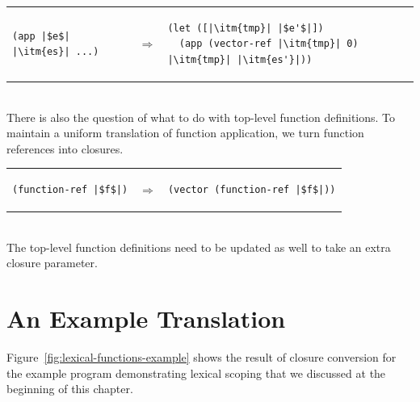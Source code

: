 \documentclass[11pt]{book}
\begin{document}
\begin{tabular}{lll}
\begin{minipage}{0.3\textwidth}
\begin{lstlisting}
(app |$e$| |\itm{es}| ...)
\end{lstlisting}
\end{minipage}
&
$\Rightarrow$
&
\begin{minipage}{0.5\textwidth}
\begin{lstlisting}
(let ([|\itm{tmp}| |$e'$|])
  (app (vector-ref |\itm{tmp}| 0) |\itm{tmp}| |\itm{es'}|))
\end{lstlisting}
\end{minipage}
\end{tabular}  \\

There is also the question of what to do with top-level function
definitions. To maintain a uniform translation of function
application, we turn function references into closures.

\begin{tabular}{lll}
\begin{minipage}{0.3\textwidth}
\begin{lstlisting}
(function-ref |$f$|)
\end{lstlisting}
\end{minipage}
&
$\Rightarrow$
&
\begin{minipage}{0.5\textwidth}
\begin{lstlisting}
(vector (function-ref |$f$|))
\end{lstlisting}
\end{minipage}
\end{tabular}  \\
%
The top-level function definitions need to be updated as well to take
an extra closure parameter.

\section{An Example Translation}
\label{sec:example-lambda}

Figure~\ref{fig:lexical-functions-example} shows the result of closure
conversion for the example program demonstrating lexical scoping that
we discussed at the beginning of this chapter.
\end{document}
